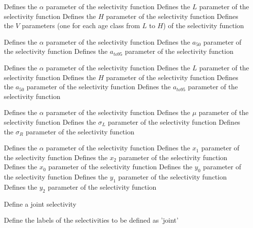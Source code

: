 \par\textbf{}\par
{} {Defines the $\alpha$ parameter of the selectivity function}
 {Defines the $L$ parameter of the selectivity function}
 {Defines the $H$ parameter of the selectivity function}
 {Defines the $V$ parameters (one for each age class from $L$ to $H$) of the selectivity function}
\par\textbf{}\par
{} {Defines the $\alpha$ parameter of the selectivity function}
 {Defines the $a_{50}$ parameter of the selectivity function}
 {Defines the $a_{to95}$ parameter of the selectivity function}
\par\textbf{}\par
{} {Defines the $\alpha$ parameter of the selectivity function}
 {Defines the $L$ parameter of the selectivity function}
 {Defines the $H$ parameter of the selectivity function}
 {Defines the $a_{50}$ parameter of the selectivity function}
 {Defines the $a_{to95}$ parameter of the selectivity function}
\par\textbf{}\par
{} {Defines the $\alpha$ parameter of the selectivity function}
 {Defines the $\mu$ parameter of the selectivity function}
 {Defines the $\sigma_L$ parameter of the selectivity function}
 {Defines the $\sigma_R$ parameter of the selectivity function}
\par\textbf{}\par
{} {Defines the $\alpha$ parameter of the selectivity function}
 {Defines the $x_1$ parameter of the selectivity function}
 {Defines the $x_2$ parameter of the selectivity function}
 {Defines the $x_0$ parameter of the selectivity function}
 {Defines the $y_0$ parameter of the selectivity function}
 {Defines the $y_1$ parameter of the selectivity function}
 {Defines the $y_2$ parameter of the selectivity function}
\par{} {Define a joint selectivity}\par
{} {Define the labels of the selectivities to be defined as 'joint'}
